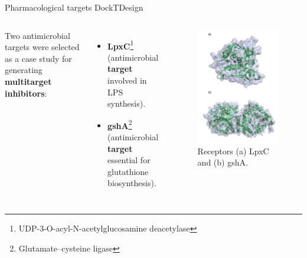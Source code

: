 \documentclass[aspectratio=169,xcolor=dvipsnames]{beamer}
\begin{document}
\begin{frame}{Pharmacological targets \hfill {\footnotesize \alert{DockTDesign}}}
    \begin{columns}[c]
        Two antimicrobial targets were selected as a case study for generating \textbf{multitarget inhibitors}:
        \begin{itemize}
            \item \textbf{LpxC}\footnote{UDP-3-O-acyl-N-acetylglucosamine deacetylase} (antimicrobial \textbf{target} involved in LPS synthesis).
            \item \textbf{gshA}\footnote{Glutamate–cysteine ligase} (antimicrobial \textbf{target} essential for glutathione biosynthesis).
        \end{itemize}
        \vspace{1em}

        \begin{figure}
            \centering
            \includegraphics[width=.55\linewidth]{imgs/lpxc-gsha-receptors.png}
            \caption{Receptors (a) LpxC and (b) gshA.}
        \end{figure}
    \end{columns}




\end{frame}
\end{document}

